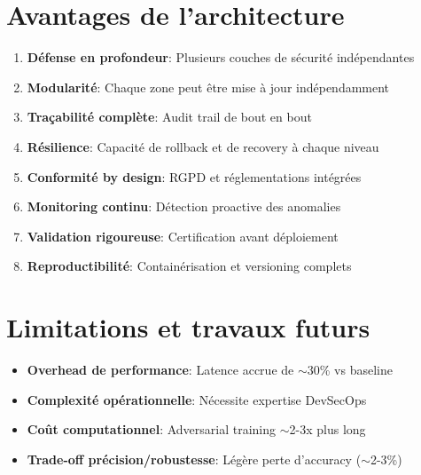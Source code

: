 \documentclass[11pt,a4paper]{article}
\begin{document}
\section{Avantages de l'architecture}

\begin{tcolorbox}[colback=green!5, colframe=green!50!black, title=\textbf{Points Forts de l'Architecture}]
\begin{enumerate}
    \item \textbf{Défense en profondeur}: Plusieurs couches de sécurité indépendantes
    \item \textbf{Modularité}: Chaque zone peut être mise à jour indépendamment
    \item \textbf{Traçabilité complète}: Audit trail de bout en bout
    \item \textbf{Résilience}: Capacité de rollback et de recovery à chaque niveau
    \item \textbf{Conformité by design}: RGPD et réglementations intégrées
    \item \textbf{Monitoring continu}: Détection proactive des anomalies
    \item \textbf{Validation rigoureuse}: Certification avant déploiement
    \item \textbf{Reproductibilité}: Containérisation et versioning complets
\end{enumerate}
\end{tcolorbox}

\section{Limitations et travaux futurs}

\begin{tcolorbox}[colback=orange!5, colframe=orange!50!black, title=\textbf{Limitations Identifiées}]
\begin{itemize}
    \item \textbf{Overhead de performance}: Latence accrue de $\sim$30\% vs baseline
    \item \textbf{Complexité opérationnelle}: Nécessite expertise DevSecOps
    \item \textbf{Coût computationnel}: Adversarial training $\sim$2-3x plus long
    \item \textbf{Trade-off précision/robustesse}: Légère perte d'accuracy ($\sim$2-3\%)
\end{itemize}
\end{tcolorbox}
\end{document}
